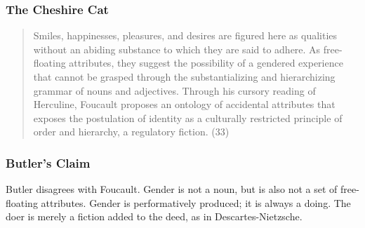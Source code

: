 \documentclass[xcolor=dvipsnames]{beamer}
\begin{document}
\begin{frame}
  \frametitle{The Cheshire Cat}
  \begin{quote}
    Smiles, happinesses, pleasures, and desires are figured here as
    qualities without an abiding substance to which they are said to
    adhere. As free-floating attributes, they suggest the possibility
    of a gendered experience that cannot be grasped through the
    substantializing and hierarchizing grammar of nouns and
    adjectives. Through his cursory reading of Herculine, Foucault
    proposes an ontology of accidental attributes that exposes the
    postulation of identity as a culturally restricted principle of
    order and hierarchy, a regulatory fiction. (33)
  \end{quote}
\end{frame}

\begin{frame}
  \frametitle{Butler's Claim}
  Butler disagrees with Foucault. Gender is not a noun, but is also
  not a set of free-floating attributes. Gender is performatively
  produced; it is always a doing. The doer is merely a fiction added
  to the deed, as in Descartes-Nietzsche.
\end{frame}

\end{document}
